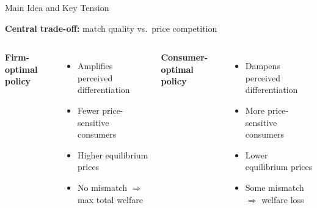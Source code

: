 \documentclass[aspectratio=169, 11pt]{beamer}
\begin{document}
\begin{frame}{Main Idea and Key Tension}

\textbf{Central trade-off:} \; match quality \; vs.\ price competition

\bigskip

\begin{columns}[T]
\textbf{Firm-optimal policy}
\begin{itemize}
    \item Amplifies perceived differentiation
    \item Fewer price-sensitive consumers
    \item Higher equilibrium prices
    \item \alert{No mismatch} $\Rightarrow$ max total welfare
\end{itemize}

\textbf{Consumer-optimal policy}
\begin{itemize}
    \item Dampens perceived differentiation
    \item More price-sensitive consumers
    \item Lower equilibrium prices
    \item \alert{Some mismatch} $\Rightarrow$ welfare loss
\end{itemize}
\end{columns}


\end{frame}
\end{document}
